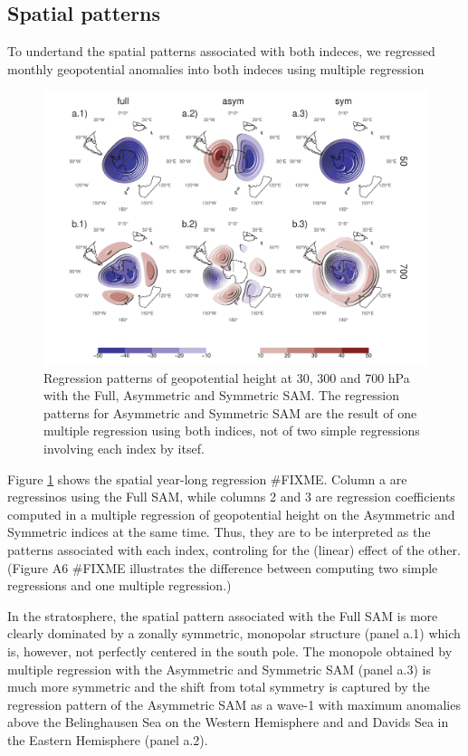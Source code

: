 \documentclass[]{ametsocV5}
\begin{document}
\subsection{Spatial patterns}

To undertand the spatial patterns associated with both indeces, we
regressed monthly geopotential anomalies into both indeces using
multiple regression

\begin{figure}
\includegraphics{2d-regr-1} \caption[Regression patterns of geopotential height at 30, 300 and 700 hPa with the Full, Asymmetric and Symmetric SAM]{Regression patterns of geopotential height at 30, 300 and 700 hPa with the Full, Asymmetric and Symmetric SAM. The regression patterns for Asymmetric and Symmetric SAM are the result of one multiple regression using both indices, not of two simple regressions involving each index by itsef.}\label{fig:2d-regr}
\end{figure}

Figure \ref{fig:2d-regr} shows the spatial year-long regression \#FIXME.
Column a are regressinos using the Full SAM, while columns 2 and 3 are
regression coefficients computed in a multiple regression of
geopotential height on the Asymmetric and Symmetric indices at the same
time. Thus, they are to be interpreted as the patterns associated with
each index, controling for the (linear) effect of the other. (Figure A6
\#FIXME illustrates the difference between computing two simple
regressions and one multiple regression.)

In the stratosphere, the spatial pattern associated with the Full SAM is
more clearly dominated by a zonally symmetric, monopolar structure
(panel a.1) which is, however, not perfectly centered in the south pole.
The monopole obtained by multiple regression with the Asymmetric and
Symmetric SAM (panel a.3) is much more symmetric and the shift from
total symmetry is captured by the regression pattern of the Asymmetric
SAM as a wave-1 with maximum anomalies above the Belinghausen Sea on the
Western Hemisphere and and Davids Sea in the Eastern Hemisphere (panel
a.2).
\end{document}

